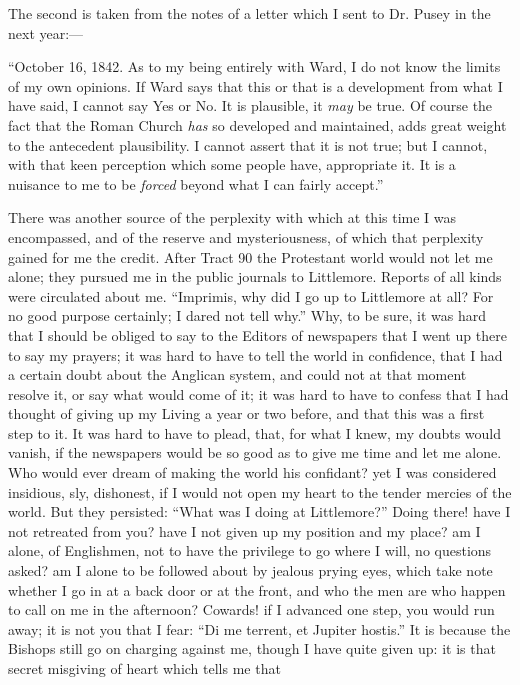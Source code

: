The second is taken from the notes of a letter which I
sent to Dr. Pusey in the next year:—

``October 16, 1842. As to my being entirely with Ward, I do not
know the limits of my own opinions. If Ward says that this or
that is a development from what I have said, I cannot say Yes or No. It
is plausible, it \emph{may} be true. Of course the fact that the Roman
Church \emph{has} so developed and maintained, adds great weight to the
antecedent plausibility. I cannot assert that it is not true; but I
cannot, with that keen perception which some people have, appropriate
it. It is a nuisance to me to be \emph{forced} beyond what I can fairly
accept.''

There was another source of the perplexity with which at this time I
was encompassed, and of the reserve and mysteriousness, of which that perplexity gained for
me the credit. After Tract 90 the Protestant world would not
let me alone; they pursued me in the public journals to Littlemore.
Reports of all kinds were circulated about me. ``Imprimis, why did I
go up to Littlemore at all? For no good purpose certainly; I dared not
tell why.'' Why, to be sure, it was hard that I should be obliged to
say to the Editors of newspapers that I went up there to say my prayers;
it was hard to have to tell the world in confidence, that I had a
certain doubt about the Anglican system, and could not at that moment
resolve it, or say what would come of it; it was hard to have to
confess that I had thought of giving up my Living a year or two before,
and that this was a first step to it. It was hard to have to plead,
that, for what I knew, my doubts would vanish, if the newspapers would
be so good as to give me time and let me alone. Who would ever dream of
making the world his confidant? yet I was considered insidious, sly,
dishonest, if I would not open my heart to the tender mercies of the
world. But they persisted: ``What was I doing at Littlemore?''
Doing there! have I not retreated from you? have I not given
up my position and my place? am I alone, of Englishmen, not to have the
privilege to go where I will, no questions asked? am I alone to be
followed about by jealous prying eyes, which take note whether I go in at
a back door or at the front, and who the men are who happen to call on
me in the afternoon? Cowards! if I advanced one step, you would run
away; it is not you that I fear: ``Di me terrent, et Jupiter hostis.''
It is because the Bishops still go on charging against me, though I have
quite given up: it is that secret misgiving of heart which tells me that
